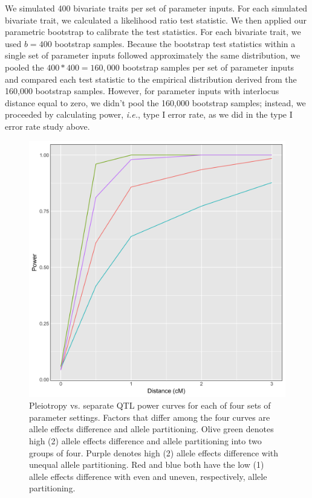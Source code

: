 \documentclass[12pt,twoside, lineno]{gsajnl}
\begin{document}
We simulated 400 bivariate traits per set of parameter inputs. For each simulated bivariate trait, we calculated a likelihood ratio test statistic. We then applied our parametric bootstrap to calibrate the test statistics. For each bivariate trait, we used $b = 400$ bootstrap samples. Because the bootstrap test statistics within a single set of parameter inputs followed approximately the same distribution, we pooled the $400 * 400 = 160,000$ bootstrap samples per set of parameter inputs and compared each test statistic to the empirical distribution derived from the 160,000 bootstrap samples. However, for parameter inputs with interlocus distance equal to zero, we didn't pool the 160,000 bootstrap samples; instead, we proceeded by calculating power, \textit{i.e.}, type I error rate, as we did in the type I error rate study above.

\begin{figure}
\includegraphics[width = \textwidth]{power-curves}
\caption{Pleiotropy vs. separate QTL power curves for each of four sets of parameter settings. Factors that differ among the four curves are allele effects difference and allele partitioning. Olive green denotes high (2) allele effects difference and allele partitioning into two groups of four. Purple denotes high (2) allele effects difference with unequal allele partitioning. Red and blue both have the low (1) allele effects difference with even and uneven, respectively, allele partitioning.}
\label{fig:power}
\end{figure}
\end{document}
